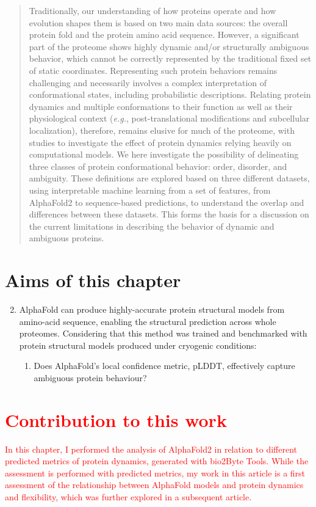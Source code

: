 \begin{abstract}
    Traditionally, our understanding of how proteins operate and how evolution shapes them is based on two main data sources: the overall protein fold and the protein amino acid sequence. However, a significant part of the proteome shows highly dynamic and/or structurally ambiguous behavior, which cannot be correctly represented by the traditional fixed set of static coordinates. Representing such protein behaviors remains challenging and necessarily involves a complex interpretation of conformational states, including probabilistic descriptions. Relating protein dynamics and multiple conformations to their function as well as their physiological context (\textit{e.g.}, post-translational modifications and subcellular localization), therefore, remains elusive for much of the proteome, with studies to investigate the effect of protein dynamics relying heavily on computational models. We here investigate the possibility of delineating three classes of protein conformational behavior: order, disorder, and ambiguity. These definitions are explored based on three different datasets, using interpretable machine learning from a set of features, from AlphaFold2 to sequence-based predictions, to understand the overlap and differences between these datasets. This forms the basis for a discussion on the current limitations in describing the behavior of dynamic and ambiguous proteins.
\end{abstract}

\section*{Aims of this chapter}
\begin{enumerate}
    \setcounter{enumi}{1}
    \item AlphaFold can produce highly-accurate protein structural models from amino-acid sequence, enabling the structural prediction across whole proteomes. Considering that this method was trained and benchmarked with protein structural models produced under cryogenic conditions: 
    \begin{enumerate}
        \item Does AlphaFold's local confidence metric, pLDDT, effectively capture ambiguous protein behaviour?
    \end{enumerate}
\end{enumerate}

\section*{\textcolor{red}{Contribution to this work}}
\textcolor{red}{In this chapter, I performed the analysis of AlphaFold2 in relation to different predicted metrics of protein dynamics, generated with bio2Byte Tools. While the assessment is performed with predicted metrics, my work in this article is a first assessment of the relationship between AlphaFold models and protein dynamics and flexibility, which was further explored in a subsequent article.}



